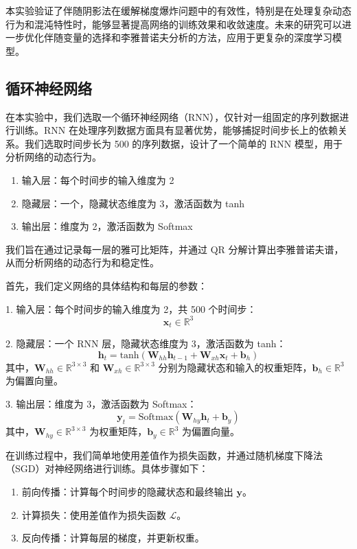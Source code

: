 本实验验证了伴随阴影法在缓解梯度爆炸问题中的有效性，特别是在处理复杂动态行为和混沌特性时，能够显著提高网络的训练效果和收敛速度。未来的研究可以进一步优化伴随变量的选择和李雅普诺夫分析的方法，应用于更复杂的深度学习模型。

\subsection{循环神经网络}

在本实验中，我们选取一个循环神经网络（RNN），仅针对一组固定的序列数据进行训练。RNN 在处理序列数据方面具有显著优势，能够捕捉时间步长上的依赖关系。我们选取时间步长为 500 的序列数据，设计了一个简单的 RNN 模型，用于分析网络的动态行为。

\begin{enumerate}
   \item 输入层：每个时间步的输入维度为 2
   \item 隐藏层：一个，隐藏状态维度为 3，激活函数为 tanh
   \item 输出层：维度为 2，激活函数为 Softmax
\end{enumerate}

我们旨在通过记录每一层的雅可比矩阵，并通过 QR 分解计算出李雅普诺夫谱，从而分析网络的动态行为和稳定性。

首先，我们定义网络的具体结构和每层的参数：

1. 输入层：每个时间步的输入维度为 2，共 500 个时间步：
   \[
   \mathbf{x}_t \in \mathbb{R}^{3}
   \]

2. 隐藏层：一个 RNN 层，隐藏状态维度为 3，激活函数为 tanh：
   \[
   \mathbf{h}_t = \text{tanh}(\mathbf{W}_{hh} \mathbf{h}_{t-1} + \mathbf{W}_{xh} \mathbf{x}_t + \mathbf{b}_h)
   \]
   其中，\(\mathbf{W}_{hh} \in \mathbb{R}^{3 \times 3}\) 和 \(\mathbf{W}_{xh} \in \mathbb{R}^{3 \times 3}\) 分别为隐藏状态和输入的权重矩阵，\(\mathbf{b}_h \in \mathbb{R}^{3}\) 为偏置向量。

3. 输出层：维度为 3，激活函数为 Softmax：
   \[
   \mathbf{y}_t = \text{Softmax}(\mathbf{W}_{hy} \mathbf{h}_t + \mathbf{b}_y)
   \]
   其中，\(\mathbf{W}_{hy} \in \mathbb{R}^{3 \times 3}\) 为权重矩阵，\(\mathbf{b}_y \in \mathbb{R}^{3}\) 为偏置向量。

在训练过程中，我们简单地使用差值作为损失函数，并通过随机梯度下降法（SGD）对神经网络进行训练。具体步骤如下：

\begin{enumerate}
   \item 前向传播：计算每个时间步的隐藏状态和最终输出 \(\mathbf{y}\)。
   \item 计算损失：使用差值作为损失函数 \(\mathcal{L}\)。
   \item 反向传播：计算每层的梯度，并更新权重。
\end{enumerate}

